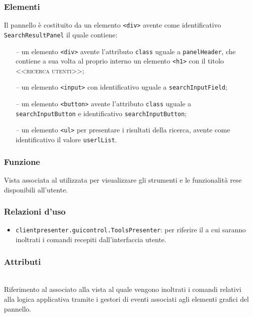 \subsubsection*{Elementi}
Il pannello è costituito da un elemento \verb'<div>' avente come identificativo \verb'SearchResultPanel' il quale contiene:
\begin{itemize}
  \item[--] un elemento \verb'<div>' avente l'attributo \verb'class' uguale a \verb'panelHeader', che contiene a sua volta al proprio interno un elemento \verb'<h1>' con il titolo \textsc{<<ricerca utenti>>};
  \item[--] un elemento \verb'<input>' con identificativo uguale a \verb'searchInputField';
  \item[--] un elemento \verb'<button>' avente l'attributo \verb'class' uguale a \verb'searchInputButton' e identificativo \verb'searchInputButton';
  \item[--] un elemento \verb'<ul>' per presentare i risultati della ricerca, avente come identificativo il valore \verb'userlList'.
\end{itemize}


\subsubsection*{Funzione}
Vista associata al   utilizzata per visualizzare gli strumenti e le funzionalità rese disponibili all'utente.

\subsubsection*{Relazioni d'uso}
\begin{itemize}
  \item \texttt{clientpresenter.guicontrol.ToolsPresenter}: per riferire il  a cui saranno inoltrati i comandi recepiti dall'interfaccia utente.
\end{itemize}

\subsubsection*{Attributi}
\begin{description}
  \item{}\\
  Riferimento al  associato alla vista al quale vengono inoltrati i comandi relativi alla logica applicativa tramite i gestori di eventi associati agli elementi grafici del pannello.
\end{description}


